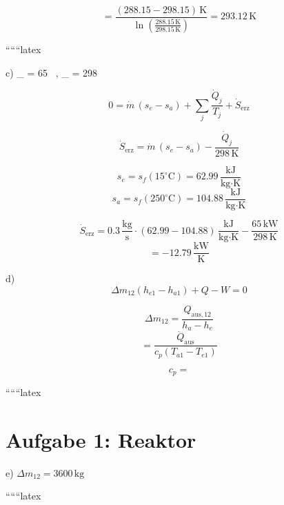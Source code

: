 \[
= \frac{(288.15 - 298.15) \, \text{K}}{\ln \left( \frac{288.15 \, \text{K}}{298.15 \, \text{K}} \right)} = 293.12 \, \text{K}
\]

``````latex

c) \quad {}_{} = 65 \, , \quad {}_{} = 298 \, 

\[
0 = \dot{m} \, (s_e - s_a) + \sum_j \frac{\dot{Q}_j}{T_j} + \dot{S}_{\text{erz}}
\]

\[
\dot{S}_{\text{erz}} = \dot{m} \, (s_e - s_a) - \frac{\dot{Q}_j}{298 \, \text{K}}
\]

\[
s_e = s_f (15^\circ \text{C}) = 62.99 \, \frac{\text{kJ}}{\text{kg} \cdot \text{K}}
\]
\[
s_a = s_f (250^\circ \text{C}) = 104.88 \, \frac{\text{kJ}}{\text{kg} \cdot \text{K}}
\]

\[
\dot{S}_{\text{erz}} = 0.3 \, \frac{\text{kg}}{\text{s}} \cdot (62.99 - 104.88) \, \frac{\text{kJ}}{\text{kg} \cdot \text{K}} - \frac{65 \, \text{kW}}{298 \, \text{K}}
\]
\[
= -12.79 \, \frac{\text{kW}}{\text{K}}
\]

d) \quad {}
\[
\Delta m_{12} (h_{e1} - h_{a1}) + Q - W = 0
\]

\[
\Delta m_{12} = \frac{Q_{\text{aus}, 12}}{h_a - h_e}
\]
\[
= \frac{\dot{Q}_{\text{aus}}}{c_p (T_{a1} - T_{e1})}
\]

\[
c_p =
\]

``````latex


\section*{Aufgabe 1: Reaktor}

e) \(\Delta m_{12} = 3600 \, \text{kg}\)

``````latex


